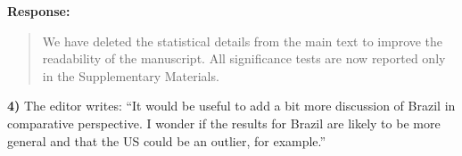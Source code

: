 \documentclass[a4paper,12pt]{article}
\begin{document}
\vspace{.3cm}

\noindent \textbf{Response:} 
\begin{quote}

We have deleted the statistical details from the main text to improve the
readability of the manuscript. All significance tests are now reported only in
the Supplementary Materials.

\end{quote}

\vspace{.3cm}

\noindent \textbf{4)} The editor writes: ``It would be useful to add a bit more
discussion of Brazil in comparative perspective. I wonder if the results for
Brazil are likely to be more general and that the US could be an outlier, for
example.''

\vspace{.3cm}
\end{document}
